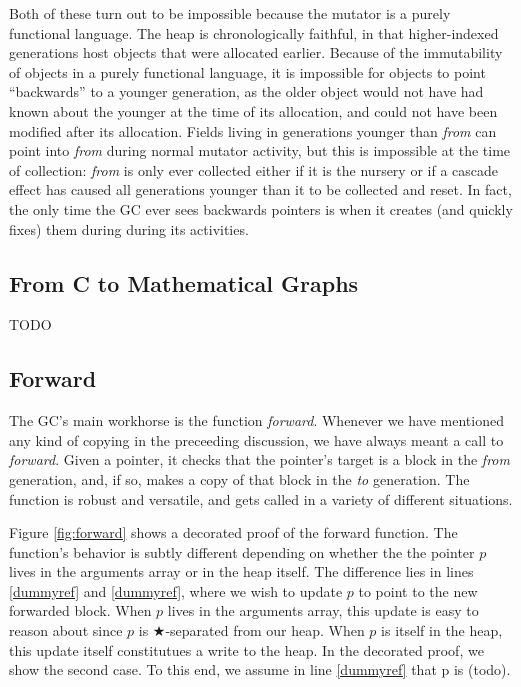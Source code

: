 Both of these turn out to be impossible because the 
{\color{magenta}mutator is a purely functional language.}
The heap is chronologically
faithful, in that higher-indexed generations host
objects that were allocated earlier. Because
of the immutability of objects in a purely functional language, 
it is impossible for objects to point ``backwards'' to 
a younger generation, as the older object would not have
had known about the younger at the time of its allocation, and could not 
have been modified after its allocation. Fields living in generations 
younger than \emph{from} can point into \emph{from} during 
normal mutator activity, but this is
impossible at the time of collection: 
\emph{from} is only ever collected either if it is
the nursery or if a cascade effect has caused all generations younger
than it to be collected and reset. 
In fact, the only time the GC ever sees backwards pointers
is when it creates (and quickly fixes) them during during its 
activities.

\subsection{From C to Mathematical Graphs}
\label{sec:movetomathgraph}
TODO

\subsection{Forward}
\label{sec:gcforward}
The GC's main workhorse is the function \emph{forward}.
Whenever we have mentioned any kind of copying in the preceeding 
discussion, we have always meant a call to \emph{forward}. 
Given a pointer, it checks that the pointer's target is a block
in the \emph{from} generation, and, if so, 
makes a copy of that block in the \emph{to} generation. 
{\color{magenta}The function 
is robust and versatile, and gets called in a variety of different 
situations.}

Figure \ref{fig:forward} shows a decorated proof of the forward function.
The function's behavior is subtly different depending on 
whether the the pointer $p$ lives in the arguments array or in the 
heap itself. The difference lies in lines \ref{dummyref} and \ref{dummyref}, where 
we wish to update $p$ to point to the new forwarded block. 
When $p$ lives in the arguments array, this update is easy to 
reason about since $p$ is $\bigstar$-separated from our heap. 
When $p$ is itself in the heap, this update itself constitutues a
write to the heap. In the decorated proof, we show the second 
case. To this end, we assume in line \ref{dummyref} that p is (todo). 

